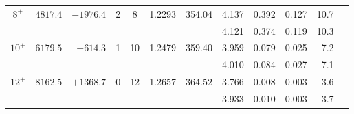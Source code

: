 \begin{table*}
\begin{center}
\begin{tabular}{crrccrrrrrrr}
%
$8^+$   &    $4817.4$   &  $-1976.4$  &  2  &   8 & 1.2293  & 354.04 
&  4.137  & 0.392  & 0.127  & 10.7 & \\
& & & & & &
&  4.121  & 0.374  & 0.119  & 10.3 \\
%
$10^+$  &    $6179.5$   &   $-614.3$  &  1  &  10 & 1.2479  & 359.40 
&  3.959  & 0.079  & 0.025  & 7.2 & \\
& & & & & &
&  4.010  & 0.084  & 0.027  & 7.1 \\
%
$12^+$  &    $8162.5$   &  $+1368.7$  &  0  &  12 & 1.2657  & 364.52 
&  3.766  & 0.008  & 0.003  & 3.6 & \\
& & & & & &
&  3.933  & 0.010  & 0.003  & 3.7 \\
%
\hline
\end{tabular}
\end{center}
\end{table*}
%

